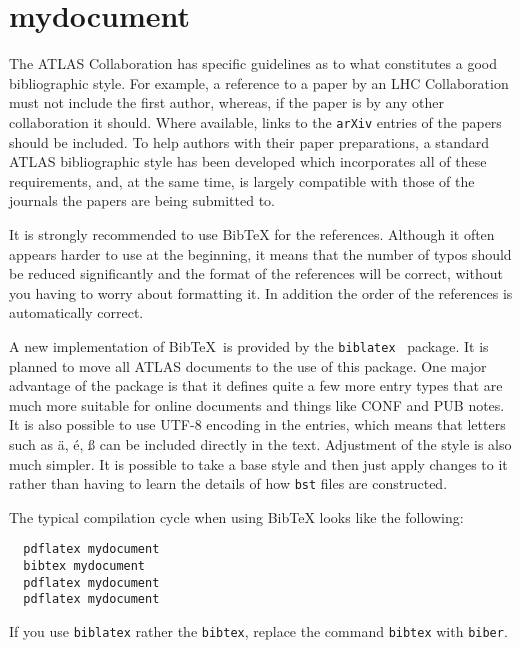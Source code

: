 \documentclass[UKenglish]{latex/atlasdoc}
\author{Ian C. Brock}
\affil{University of Bonn}
\newcommand*{\BibTeX}{Bib\TeX}
\newcommand{\Package}[1]{\texttt{#1}\xspace}
\begin{document}
 


\section{mydocument}

The ATLAS Collaboration has specific guidelines as to what constitutes a good bibliographic style. 
For example, a reference to a paper by an LHC Collaboration must not include the first author,
whereas, if the paper is by any other collaboration it should. 
Where available, links to the \texttt{arXiv} entries of the papers should be included. 
To help authors with their paper preparations,
a standard ATLAS bibliographic style has been developed which incorporates all of these requirements, 
and, at the same time, is largely compatible with those of the journals the papers are being submitted to. 

It is strongly recommended to use \BibTeX{} for the references. 
Although it often appears harder to use at the beginning, it means that the number of
typos should be reduced significantly and the format of the references
will be correct, without you having to worry about formatting it.
In addition the order of the references is automatically correct.

A new implementation of \BibTeX\ is provided by the \texttt{biblatex}~\cite{biblatex} package.
It is planned to move all ATLAS documents to the use of this package.
One major advantage of the package is that it defines quite a few more entry types
that are much more suitable for online documents and things like CONF and PUB notes.
It is also possible to use UTF-8 encoding in the entries, which means that letters such as
ä, é, ß can be included directly in the text.
Adjustment of the style is also much simpler.
It is possible to take a base style and then just apply changes to it rather than
having to learn the details of how \texttt{bst} files are constructed.

The typical compilation cycle when using \BibTeX{} looks like the following:
%
\begin{verbatim}
  pdflatex mydocument
  bibtex mydocument
  pdflatex mydocument
  pdflatex mydocument
\end{verbatim}
If you use \Package{biblatex} rather the \Package{bibtex}, replace the command
\texttt{bibtex} with \texttt{biber}.
\end{document}
